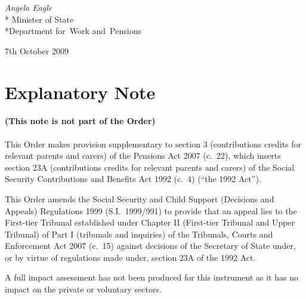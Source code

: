 \documentclass[12pt,a4paper]{article}
\begin{document}
{\raggedleft
\emph{Angela Eagle}\\*
Minister
of State\\*Department 
for~Work and~Pensions

}

7th October 2009

\small

\part{Explanatory Note}

\renewcommand\parthead{— Explanatory Note}

\subsection*{(This note is not part of the Order)}

This Order makes provision supplementary to section 3 (contributions credits for relevant parents and carers) of the Pensions Act 2007 (c.~22), which inserts section 23A (contributions credits for relevant parents and carers) of the Social Security Contributions and Benefits Act 1992 (c.~4) (“the 1992 Act”).

This Order amends the Social Security and Child Support (Decisions and Appeals) Regulations 1999 (S.I.~1999/991) to provide that an appeal lies to the First-tier Tribunal established under Chapter II (First-tier Tribunal and Upper Tribunal) of Part I (tribunals and inquiries) of the Tribunals, Courts and Enforcement Act 2007 (c.~15) against decisions of the Secretary of State under, or by virtue of regulations made under, section 23A of the 1992 Act.

A full impact assessment has not been produced for this instrument as it has no impact on the private or voluntary sectors. 
\end{document}
